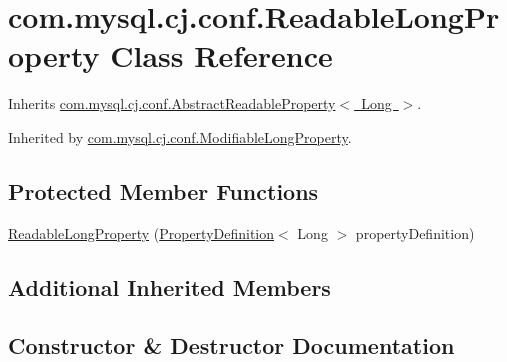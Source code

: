 \hypertarget{classcom_1_1mysql_1_1cj_1_1conf_1_1_readable_long_property}{}\section{com.\+mysql.\+cj.\+conf.\+Readable\+Long\+Property Class Reference}
\label{classcom_1_1mysql_1_1cj_1_1conf_1_1_readable_long_property}


Inherits \mbox{\hyperlink{classcom_1_1mysql_1_1cj_1_1conf_1_1_abstract_readable_property}{com.\+mysql.\+cj.\+conf.\+Abstract\+Readable\+Property$<$ Long $>$}}.



Inherited by \mbox{\hyperlink{classcom_1_1mysql_1_1cj_1_1conf_1_1_modifiable_long_property}{com.\+mysql.\+cj.\+conf.\+Modifiable\+Long\+Property}}.

\subsection*{Protected Member Functions}
\begin{DoxyCompactItemize}
\item 
\mbox{\hyperlink{classcom_1_1mysql_1_1cj_1_1conf_1_1_readable_long_property_ad017e75f23c837057d9cce310b54aa38}{Readable\+Long\+Property}} (\mbox{\hyperlink{interfacecom_1_1mysql_1_1cj_1_1conf_1_1_property_definition}{Property\+Definition}}$<$ Long $>$ property\+Definition)
\end{DoxyCompactItemize}
\subsection*{Additional Inherited Members}


\subsection{Constructor \& Destructor Documentation}
\mbox{\label{classcom_1_1mysql_1_1cj_1_1conf_1_1_readable_long_property_ad017e75f23c837057d9cce310b54aa38}} 
